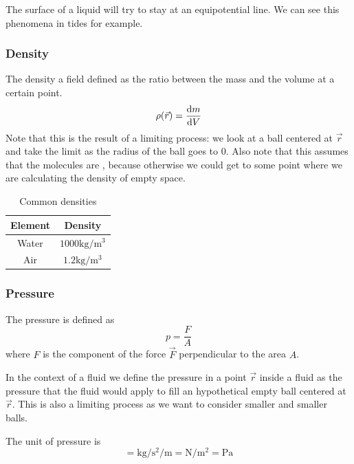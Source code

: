 \documentclass[14pt]{extarticle}
\begin{document}
The surface of a liquid will try to stay at an equipotential line. We can see this phenomena in tides for example.

\subsubsection{Density}

The density a field defined as the ratio between the mass and the volume at a certain point.
\begin{equation}
    \rho(\vec r) = \dv{m}{V}
\end{equation}
Note that this is the result of a limiting process: we look at a ball centered at $\vec r$ and take the limit as the radius of the ball goes to $0$.
Also note that this assumes that the molecules are , because otherwise we could get to some point where we are calculating the density of empty space.

\begin{table}[H]
    \centering
    \begin{tabular}{|c|c|}
        \hline
        \textbf{Element} & \textbf{Density}                         \\
        \hline
        Water            & $1000 \si{\kilogram \per \meter \cubed}$ \\
        Air              & $1.2 \si{\kilogram \per \meter \cubed}$  \\
        \hline
    \end{tabular}
    \caption{Common densities}
\end{table}

\subsubsection{Pressure}

The pressure is defined as
\begin{equation}
    p = \frac{F}{A}
\end{equation}
where $F$ is the component of the force $\vec{F}$ perpendicular to the area $A$.

In the context of a fluid we define the pressure in a point $\vec r$ inside a fluid as the pressure that the fluid would apply to fill an hypothetical empty ball centered at $\vec r$.
This is also a limiting process as we want to consider smaller and smaller balls.

The unit of pressure is
\begin{equation}
    [p] = \si{\kilogram \per \second \squared \per \meter} = \si {\newton \per \meter \squared} = \si{\pascal}
\end{equation}
\end{document}
